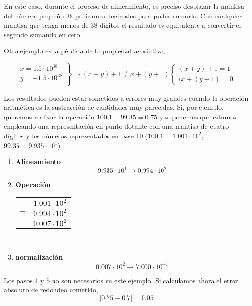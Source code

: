 En este caso, durante el proceso de alineamiento, es preciso desplazar la mantisa del número pequeño 38 posiciones decimales para poder sumarlo. Con cualquier mantisa que tenga menos de 38 dígitos el resultado es equivalente a convertir el segundo sumando en cero.

Otro ejemplo es la pérdida de la propiedad asociativa,

\begin{equation*}
\left. \begin{aligned}
x=1.5\cdot10^{38}\\
y=-1.5\cdot10^{38}\\
\end{aligned}
\right\}
\Rightarrow
(x+y)+1\neq x+(y+1)
\begin{cases}
(x+y)+1=1\\
(x+(y+1)=0
\end{cases}
\end{equation*}

Los resultados pueden estar sometidos a errores muy grandes cuando la operación aritmética es la sustracción de cantidades muy parecidas. Si, por ejemplo, queremos realizar la operación $100.1-99.35=0.75$ y suponemos que estamos empleando una representación en punto flotante con una mantisa de cuatro dígitos y los números representados en base 10 ($100.1=1.001\cdot10^2$, $99.35=9.935\cdot 10^1$) 

\begin{enumerate}
\item \textbf{Alineamiento}
\begin{equation*}
9.935\cdot 10^1\rightarrow 0.994 \cdot 10^2
\end{equation*}

\item \textbf{Operación}

\begin{tabular}{c r}
&$1.001\cdot10^2$\\
$-$&$0.994\cdot10^2$\\
\hline
&$0.007\cdot10^2$
\end{tabular}\\

\item \textbf{normalización}
\begin{equation*}
0.007\cdot10^2\rightarrow 7.000\cdot10^{-1}
\end{equation*}
\end{enumerate}

Los pasos $4$ y $5$ no son necesarios en este ejemplo. Si calculamos ahora el error absoluto de redondeo cometido,
\begin{equation*}
\vert 0.75-0.7 \vert =0.05
\end{equation*} 

